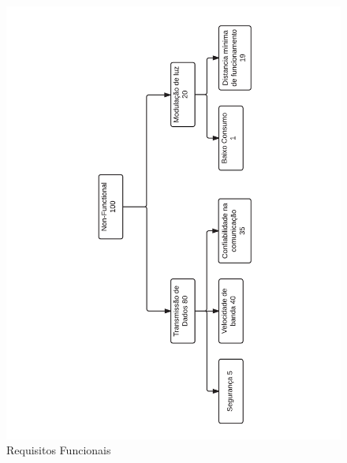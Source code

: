 	\begin{figure}[htb]
		\caption{\label{fig_req2} Requisitos Funcionais }
		\centering
		\includegraphics[width=1.0\textwidth, trim={1cm 1cm 1cm 1cm}, clip]{ReqTree2.pdf}
	\end{figure}
	
